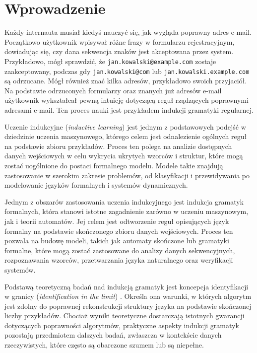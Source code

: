 \chapter{Wprowadzenie}  
\label{cha:wprowadzenie}  

Każdy internauta musiał kiedyś nauczyć się, jak wygląda poprawny adres e-mail. Początkowo użytkownik wpisywał różne frazy w formularzu rejestracyjnym, dowiadując się, czy dana sekwencja znaków jest akceptowana przez system. Przykładowo, mógł sprawdzić, że \texttt{jan.kowalski@example.com} zostaje zaakceptowany, podczas gdy \texttt{jan.kowalski@com} lub \texttt{jan.kowalski.example.com} są odrzucane. Mógł również znać kilka adresów, przykładowo swoich przyjaciół. Na podstawie odrzuconych formularzy oraz znanych już adresów e-mail użytkownik wykształcał pewną intuicję dotyczącą reguł rządzących poprawnymi adresami e-mail. Ten proces nauki jest przykładem indukcji gramatyki regularnej. 

Uczenie indukcyjne (\textit{inductive learning}) jest jednym z podstawowych podejść w dziedzinie uczenia maszynowego, którego celem jest odnalezienie ogólnych reguł na podstawie zbioru przykładów. Proces ten polega na analizie dostępnych danych wejściowych w celu wykrycia ukrytych wzorców i struktur, które mogą zostać uogólnione do postaci formalnego modelu. Modele takie znajdują zastosowanie w szerokim zakresie problemów, od klasyfikacji i przewidywania po modelowanie języków formalnych i systemów dynamicznych.  

Jednym z obszarów zastosowania uczenia indukcyjnego jest indukcja gramatyk formalnych, która stanowi istotne zagadnienie zarówno w uczeniu maszynowym, jak i teorii automatów. Jej celem jest odtworzenie reguł opisujących język formalny na podstawie skończonego zbioru danych wejściowych. Proces ten pozwala na budowę modeli, takich jak automaty skończone lub gramatyki formalne, które mogą zostać zastosowane do analizy danych sekwencyjnych, rozpoznawania wzorców, przetwarzania języka naturalnego oraz weryfikacji systemów.  

Podstawą teoretyczną badań nad indukcją gramatyk jest koncepcja identyfikacji w granicy (\textit{identification in the limit}) \cite{GOLD1967447}. Określa ona warunki, w których algorytm jest zdolny do poprawnej rekonstrukcji struktury języka na podstawie skończonej liczby przykładów. Chociaż wyniki teoretyczne dostarczają istotnych gwarancji dotyczących poprawności algorytmów, praktyczne aspekty indukcji gramatyk pozostają przedmiotem dalszych badań, zwłaszcza w kontekście danych rzeczywistych, które często są obarczone szumem lub są niepełne.

